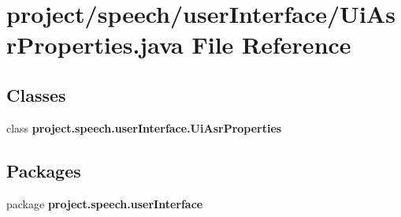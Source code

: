 \section{project/speech/user\+Interface/\+Ui\+Asr\+Properties.java File Reference}
\label{_ui_asr_properties_8java}
\subsection*{Classes}
\begin{DoxyCompactItemize}
\item 
class {\bf project.\+speech.\+user\+Interface.\+Ui\+Asr\+Properties}
\end{DoxyCompactItemize}
\subsection*{Packages}
\begin{DoxyCompactItemize}
\item 
package {\bf project.\+speech.\+user\+Interface}
\end{DoxyCompactItemize}
